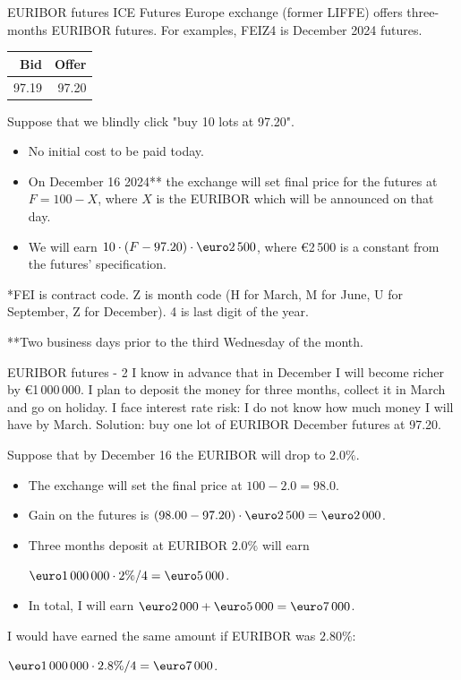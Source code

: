 \documentclass{beamer}
\renewcommand{\EUR}[1]{\textup{\euro}#1}
\begin{document}
\begin{frame}{EURIBOR futures}
\justify
ICE Futures Europe exchange (former LIFFE) offers three-months EURIBOR futures. For examples, \alert{FEIZ4} is December 2024 futures.

\justify
\centering
\begin{tabular}{r|r}
Bid & Offer \\ \hline
97.19 & 97.20
\end{tabular}

\justify
Suppose that we blindly click "buy 10 lots at 97.20".
\begin{itemize}
\justifying
\item No initial cost to be paid today.
\item On December 16 2024** the exchange will set final price for the futures at $F = 100 - X$, where 
$X$ is the EURIBOR which will be announced on that day.
\item We will earn $10 \cdot (F - 97.20) \cdot \EUR{2\,500}$, where \EUR{2\,500} is a constant from the futures' specification.
\end{itemize}

\justify
*FEI is contract code. Z is month code (H for March, M for June, U for September, Z for December). 4 is last digit of the year.

\justify
**Two business days prior to the third Wednesday of the month.
\end{frame}



\begin{frame}{EURIBOR futures - 2}
\justify
I know in advance that in December I will become richer by \EUR{1\,000\,000}. I plan to deposit the money for three months, collect it in March and go on holiday. I face \alert{interest rate risk}: I do not know how  much money I will have by March.
\justify
Solution: buy one lot of EURIBOR December futures at 97.20.

\justify
Suppose that by December 16 the EURIBOR will drop to $2.0\%$.
\begin{itemize}
\justifying
\item The exchange will set the final price at $100 - 2.0 = 98.0$.
\item Gain on the futures is $(98.00-97.20)\cdot\EUR{2\,500} = \EUR{2\,000}$.
\item Three months deposit at EURIBOR $2.0\%$ will earn

$\EUR{1\,000\,000} \cdot 2\% / 4 = \EUR{5\,000}$.
\item In total, I will earn $\EUR{2\,000} + \EUR{5\,000} = \EUR{7\,000}$.
\end{itemize} 

\justify
I would have earned the same amount if EURIBOR was $2.80\%$:

$\EUR{1\,000\,000} \cdot 2.8\%/4 =\EUR{7\,000}$.
\end{frame}
\end{document}
